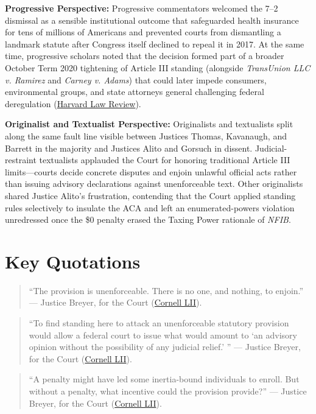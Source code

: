 \documentclass[12pt]{article}
\begin{document}
\textbf{Progressive Perspective:} Progressive commentators welcomed the 7--2 dismissal as a sensible institutional outcome that safeguarded health insurance for tens of millions of Americans and prevented courts from dismantling a landmark statute after Congress itself declined to repeal it in 2017. At the same time, progressive scholars noted that the decision formed part of a broader October Term 2020 tightening of Article III standing (alongside \textit{TransUnion LLC v. Ramirez} and \textit{Carney v. Adams}) that could later impede consumers, environmental groups, and state attorneys general challenging federal deregulation (\href{https://harvardlawreview.org/print/vol-135/california-v-texas/}{Harvard Law Review}).

\textbf{Originalist and Textualist Perspective:} Originalists and textualists split along the same fault line visible between Justices Thomas, Kavanaugh, and Barrett in the majority and Justices Alito and Gorsuch in dissent. Judicial-restraint textualists applauded the Court for honoring traditional Article III limits---courts decide concrete disputes and enjoin unlawful official acts rather than issuing advisory declarations against unenforceable text. Other originalists shared Justice Alito's frustration, contending that the Court applied standing rules selectively to insulate the ACA and left an enumerated-powers violation unredressed once the \$0 penalty erased the Taxing Power rationale of \textit{NFIB}.

\section{Key Quotations}

\begin{quote}
``The provision is unenforceable. There is no one, and nothing, to enjoin.'' --- Justice Breyer, for the Court (\href{https://www.law.cornell.edu/supremecourt/text/19-840}{Cornell LII}).
\end{quote}

\begin{quote}
``To find standing here to attack an unenforceable statutory provision would allow a federal court to issue what would amount to `an advisory opinion without the possibility of any judicial relief.' '' --- Justice Breyer, for the Court (\href{https://www.law.cornell.edu/supremecourt/text/19-840}{Cornell LII}).
\end{quote}

\begin{quote}
``A penalty might have led some inertia-bound individuals to enroll. But without a penalty, what incentive could the provision provide?'' --- Justice Breyer, for the Court (\href{https://www.law.cornell.edu/supremecourt/text/19-840}{Cornell LII}).
\end{quote}
\end{document}
